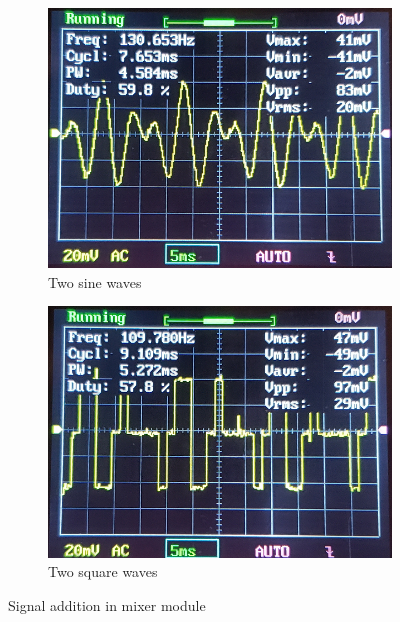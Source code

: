 \documentclass[12pt]{article}
\begin{document}
\begin{figure}[htb]
    \centering
    \begin{subfigure}{.49\textwidth}
        \centering
        \includegraphics[width=0.96\linewidth]{img/sine_multi.png}
        \caption{Two sine waves}
        \label{fig:sine_multi}
    \end{subfigure}
    \begin{subfigure}{.49\textwidth}
        \centering
        \includegraphics[width=\linewidth]{img/square_multi.png}
        \caption{Two square waves}
        \label{fig:square_multi}
    \end{subfigure}
    \caption{Signal addition in mixer module}
    \label{fig:mixer}
\end{figure}
\end{document}

